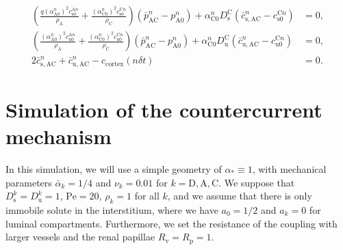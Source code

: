 \documentclass{article}
\begin{document}
\begin{align}
    \left( \frac{q(\alpha_{\mathrm{A}0}^n)^2c_{\mathrm{s}0}^{\mathrm{A}n}}{\rho_{\mathrm{A}}}+ \frac{(\alpha_{\mathrm{C}0}^n)^2c_{\mathrm{s}0}^{\mathrm{C}n}}{\rho_{\mathrm{C}}}\right)\left( \bar{p}_{\mathrm{AC}}^{n} - p_{\mathrm{A}0}^{n} \right)+\alpha_{\mathrm{C}0}^{n}D_{\mathrm{s}}^{\mathrm{C}}\left( \bar{c}_{\mathrm{s},\mathrm{AC}}^{n} - c_{\mathrm{s}0}^{\mathrm{C}n} \right) &= 0,\\
    \left( \frac{(\alpha_{\mathrm{A}0}^n)^2c_{\mathrm{u}0}^{\mathrm{A}n}}{\rho_{\mathrm{A}}}+ \frac{(\alpha_{\mathrm{C}0}^n)^2c_{\mathrm{u}0}^{\mathrm{C}n}}{\rho_{\mathrm{C}}}\right)\left( \bar{p}_{\mathrm{AC}}^{n} - p_{\mathrm{A}0}^{n} \right)+\alpha_{\mathrm{C}0}^{n}D_{\mathrm{u}}^{\mathrm{C}}\left( \bar{c}_{\mathrm{u},\mathrm{AC}}^{n} - c_{\mathrm{u}0}^{\mathrm{C}n} \right) &= 0,\\
    2\bar{c}_{\mathrm{s},\mathrm{AC}}^{n}+\bar{c}_{\mathrm{u},\mathrm{AC}}^{n} - c_{\mathrm{cortex}}(n\delta t)&=0.
\end{align}


\section{Simulation of the countercurrent mechanism}

In this simulation, we will use a simple geometry of $\alpha_* \equiv 1$, with mechanical parameters $\bar{\alpha}_k = 1/4$ and $\nu_k = 0.01$ for $k=\mathrm{D},\mathrm{A},\mathrm{C}$.
We suppose that $D_\mathrm{s}^k = D_{\mathrm{u}}^k = 1$, $\mathrm{Pe} = 20$, $\rho_k = 1$ for all $k$, and we assume that there is only immobile solute in the interstitium, where we have $a_0 = 1/2$ and $a_k = 0$ for luminal compartments.
Furthermore, we set the resistance of the coupling with larger vessels and the renal papillae $R_\mathrm{v} = R_\mathrm{p} = 1$.
\end{document}
